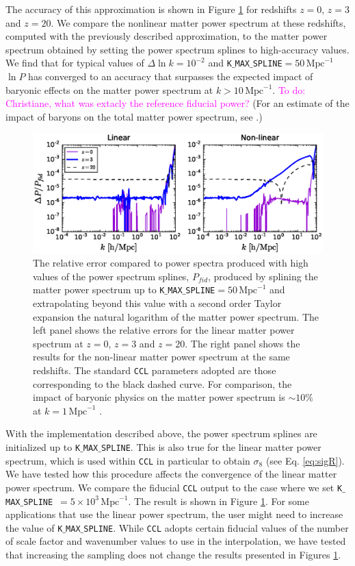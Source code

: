 \documentclass[\docopts]{\docclass}
\newcommand{\todo}[1]{\textcolor{magenta}{To do: #1}}
\newcommand{\ccl}{{\tt CCL}\xspace}
\begin{document}
The accuracy of this approximation is shown in Figure \ref{fig:NLextrapol} for redshifts $z=0$, $z=3$ and $z=20$. We compare the nonlinear matter power spectrum at these redshifts, computed with the previously described approximation, to the matter power spectrum obtained by setting the power spectrum splines to high-accuracy values. We find that for typical values of $\Delta \ln k=10^{-2}$ and {\tt K$\_$MAX$\_$SPLINE}$=50\,\text{Mpc}^{-1}$ $\ln P$ has converged to an accuracy that surpasses the expected impact of baryonic effects on the matter power spectrum at $k>10\,\text{Mpc}^{-1}$. \todo{Christiane, what was extacly the reference fiducial power?} (For an estimate of the impact of baryons on the total matter power spectrum, see \citealt{Schneider15}.) 

\begin{figure}
\centering
\includegraphics[width=1.0\textwidth]{plot_power.eps}
\caption{The relative error compared to power spectra produced with high values of the power spectrum splines, $P_{fid}$, produced by splining the matter power spectrum up to {\tt K$\_$MAX$\_$SPLINE}$=50\,\text{Mpc}^{-1}$ and extrapolating beyond this value with a second order Taylor expansion the natural logarithm of the matter power spectrum. The left panel shows the relative errors for the linear matter power spectrum at $z=0$, $z=3$ and $z=20$. The right panel shows the results for the non-linear matter power spectrum at the same redshifts. The standard \ccl parameters adopted are those corresponding to the black dashed curve. For comparison, the impact of baryonic physics on the matter power spectrum is $\sim 10\%$ at $k=1\,\text{Mpc}^{-1}$ \citep{Schneider15}.}
\label{fig:NLextrapol}
\end{figure}

With the implementation described above, the power spectrum splines are initialized up to {\tt K$\_$MAX$\_$SPLINE}. This is also true for the linear matter power spectrum, which is used within \ccl in particular to obtain $\sigma_8$ (see Eq. \ref{eq:sigR}). We have tested how this procedure affects the convergence of the linear matter power spectrum. We compare the fiducial \ccl output to the case where we set {\tt K$\_$MAX$\_$SPLINE}~$=5\times 10^3\,\text{Mpc}^{-1}$. The result is shown in Figure \ref{fig:NLextrapol}. For some applications that use the linear power spectrum, the user might need to increase the value of {\tt K$\_$MAX$\_$SPLINE}. While \ccl adopts certain fiducial values of the number of scale factor and wavenumber values to use in the interpolation, we have tested that increasing the sampling does not change the results presented in Figures \ref{fig:NLextrapol}. 
\end{document}
